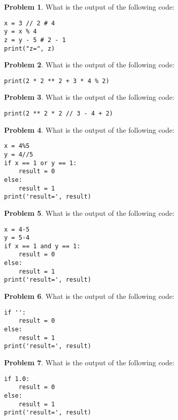 \documentclass[10pt]{article}
\theoremstyle{definition}
\newtheorem{problem}{Problem}
\begin{document}
\begin{problem}
    What is the output of the following code:
\end{problem}
\begin{lstlisting}
x = 3 // 2 # 4
y = x % 4
z = y - 5 # 2 - 1
print("z=", z)
\end{lstlisting}
\vspace{1.5in}

\begin{problem}
    What is the output of the following code:
\end{problem}
\begin{lstlisting}
print(2 * 2 ** 2 + 3 * 4 % 2)
\end{lstlisting}
\vspace{1.5in}

\begin{problem}
    What is the output of the following code:
\end{problem}
\begin{lstlisting}
print(2 ** 2 * 2 // 3 - 4 + 2)
\end{lstlisting}
\vspace{1.5in}

\begin{problem}
    What is the output of the following code:
\end{problem}
\begin{lstlisting}
x = 4%5
y = 4//5
if x == 1 or y == 1:
    result = 0
else:
    result = 1
print('result=', result)
\end{lstlisting}
\vspace{1.8in}

\begin{problem}
    What is the output of the following code:
\end{problem}
\begin{lstlisting}
x = 4-5
y = 5-4
if x == 1 and y == 1:
    result = 0
else:
    result = 1
print('result=', result)
\end{lstlisting}
\vspace{1.8in}

\begin{problem}
    What is the output of the following code:
\end{problem}
\begin{lstlisting}
if '':
    result = 0
else:
    result = 1
print('result=', result)
\end{lstlisting}
\vspace{1.8in}

\begin{problem}
    What is the output of the following code:
\end{problem}
\begin{lstlisting}
if 1.0:
    result = 0
else:
    result = 1
print('result=', result)
\end{lstlisting}
\vspace{1.8in}
\end{document}
